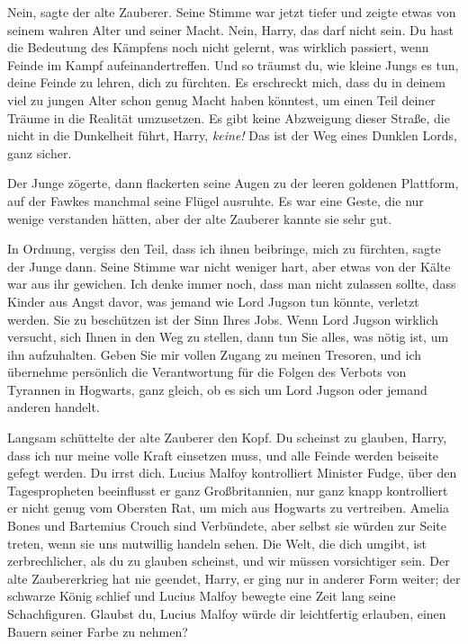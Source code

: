 \glqq{}Nein\grqq{}, sagte der alte Zauberer. Seine Stimme war jetzt tiefer und
zeigte etwas von seinem wahren Alter und seiner Macht. \glqq{}Nein, Harry, das
darf nicht sein. Du hast die Bedeutung des Kämpfens noch nicht gelernt, was
wirklich passiert, wenn Feinde im Kampf aufeinandertreffen. Und so träumst du,
wie kleine Jungs es tun, deine Feinde zu lehren, dich zu fürchten. Es erschreckt
mich, dass du in deinem viel zu jungen Alter schon genug Macht haben könntest,
um einen Teil deiner Träume in die Realität umzusetzen. Es gibt keine Abzweigung
dieser Straße, die nicht in die Dunkelheit führt, Harry, \emph{keine!} Das ist
der Weg eines Dunklen Lords, ganz sicher.\grqq{}

Der Junge zögerte, dann flackerten seine Augen zu der leeren goldenen Plattform,
auf der Fawkes manchmal seine Flügel ausruhte. Es war eine Geste, die nur wenige
verstanden hätten, aber der alte Zauberer kannte sie sehr gut.

\glqq{}In Ordnung, vergiss den Teil, dass ich ihnen beibringe, mich zu
fürchten\grqq{}, sagte der Junge dann. Seine Stimme war nicht weniger hart, aber
etwas von der Kälte war aus ihr gewichen. \glqq{}Ich denke immer noch, dass man
nicht zulassen sollte, dass Kinder aus Angst davor, was jemand wie Lord Jugson
tun könnte, verletzt werden. Sie zu beschützen ist der Sinn Ihres Jobs. Wenn
Lord Jugson wirklich versucht, sich Ihnen in den Weg zu stellen, dann tun Sie
alles, was nötig ist, um ihn aufzuhalten. Geben Sie mir vollen Zugang zu meinen
Tresoren, und ich übernehme persönlich die Verantwortung für die Folgen des
Verbots von Tyrannen in Hogwarts, ganz gleich, ob es sich um Lord Jugson oder
jemand anderen handelt.\grqq{}

Langsam schüttelte der alte Zauberer den Kopf. \glqq{}Du scheinst zu glauben,
Harry, dass ich nur meine volle Kraft einsetzen muss, und alle Feinde werden
beiseite gefegt werden. Du irrst dich. Lucius Malfoy kontrolliert Minister
Fudge, über den Tagespropheten beeinflusst er ganz Großbritannien, nur ganz
knapp kontrolliert er nicht genug vom Obersten Rat, um mich aus Hogwarts zu
vertreiben. Amelia Bones und Bartemius Crouch sind Verbündete, aber selbst sie
würden zur Seite treten, wenn sie uns mutwillig handeln sehen. Die Welt, die
dich umgibt, ist zerbrechlicher, als du zu glauben scheinst, und wir müssen
vorsichtiger sein. Der alte Zaubererkrieg hat nie geendet, Harry, er ging nur in
anderer Form weiter; der schwarze König schlief und Lucius Malfoy bewegte eine
Zeit lang seine Schachfiguren. Glaubst du, Lucius Malfoy würde dir leichtfertig
erlauben, einen Bauern seiner Farbe zu nehmen?\grqq{}


